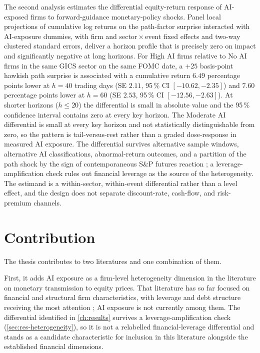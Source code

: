 The second analysis estimates the differential equity-return
response of AI-exposed firms to forward-guidance monetary-policy
shocks. Panel local projections \citep{jorda2005} of cumulative
log returns on the \citet{swanson2021} path-factor surprise
interacted with AI-exposure dummies, with firm and
sector\,$\times$\,event fixed effects and two-way clustered
standard errors, deliver a horizon profile that is precisely
zero on impact and significantly negative at long horizons.
For High AI firms relative to No AI firms in the same GICS
sector on the same FOMC date, a $+25$ basis-point hawkish path
surprise is associated with a cumulative return $6.49$
percentage points lower at $h = 40$ trading days
(SE $2.11$, 95\,\% CI $[-10.62, -2.35]$) and $7.60$ percentage
points lower at $h = 60$ (SE $2.53$, 95\,\% CI $[-12.56, -2.63]$).
At shorter horizons ($h \leq 20$) the differential is small in
absolute value and the 95\,\% confidence interval contains zero
at every key horizon. The Moderate AI differential is small at
every key horizon and not statistically distinguishable from
zero, so the pattern is tail-versus-rest rather than a graded
dose-response in measured AI exposure. The differential
survives alternative sample windows, alternative AI
classifications, abnormal-return outcomes, and a partition of
the path shock by the sign of contemporaneous S\&P futures
reaction \citep{bauerSwanson2023}; a leverage-amplification
check rules out financial leverage as the source of the
heterogeneity. The estimand is a within-sector, within-event
differential rather than a level effect, and the design does
not separate discount-rate, cash-flow, and risk-premium
channels.


\section{Contribution}
\label{sec:intro-contribution}


The thesis contributes to two literatures and one combination of them.

First, it adds AI exposure as a firm-level heterogeneity dimension
in the literature on monetary transmission to equity prices.
That literature has so far focused on financial and structural
firm characteristics, with leverage and debt structure receiving
the most attention \citep{ottonelloWinberry2020,
gurkaynakKarasoyCanLee2022, cloyneEtAl2023, arinEtAl2025}; AI
exposure is not currently among them. The differential identified
in \cref{ch:results} survives a leverage-amplification check
(\cref{sec:res-heterogeneity}), so it is not a relabelled
financial-leverage differential and stands as a candidate
characteristic for inclusion in this literature alongside the
established financial dimensions.

